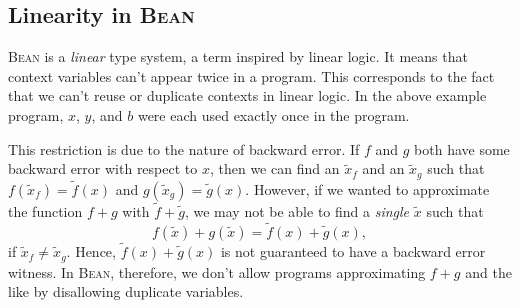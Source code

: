 \documentclass[a4paper]{article}
\newcommand{\Bean}{\textsc{Bean}}
\begin{document}
\subsection{Linearity in \Bean}
\Bean{} is a \emph{linear} type system, a term inspired by linear logic. It means that context variables can't appear twice in a program. This corresponds to the fact that we can't reuse or duplicate contexts in linear logic. In the above example program, $x$, $y$, and $b$ were each used exactly once in the program. 

This restriction is due to the nature of backward error. If $f$ and $g$ both have some backward error with respect to $x$, then we can find an $\tilde{x}_f$ and an $\tilde{x}_g$ such that $f(\tilde{x}_f)=\tilde{f}(x)$ and $g(\tilde{x}_g)=\tilde{g}(x)$. However, if we wanted to approximate the function $f+g$ with $\tilde{f}+\tilde{g}$, we may not be able to find a \emph{single} $\tilde{x}$ such that 
\begin{equation*}
    f(\tilde{x})+g(\tilde{x})=\tilde{f}(x)+\tilde{g}(x),
\end{equation*}
if $\tilde{x}_f\neq \tilde{x}_g$. Hence, $\tilde{f}(x)+\tilde{g}(x)$ is not guaranteed to have a backward error witness. In \Bean{}, therefore, we don't allow programs approximating $f+g$ and the like by disallowing duplicate variables.
\end{document}
